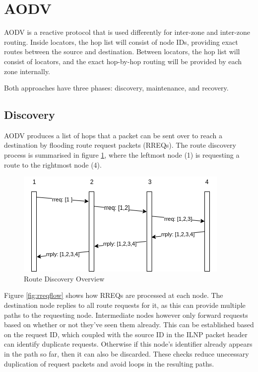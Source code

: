 \documentclass[12pt]{article}
\begin{document}
\section{AODV}

AODV is a reactive protocol that is used differently for inter-zone and inter-zone routing. Inside locators, the hop list will consist of node IDs, providing exact routes between the source and destination. Between locators, the hop list will consist of locators, and the exact hop-by-hop routing will be provided by each zone internally.

Both approaches have three phases: discovery, maintenance, and recovery.

\subsection{Discovery}

AODV produces a list of hops that a packet can be sent over to reach a destination by flooding route request packets (RREQs). The route discovery process is summarised in figure \ref{fig:path}, where the leftmost node (1) is requesting a route to the rightmost node (4).

\begin{figure}[!ht]
	\centering
	\includegraphics[width=\linewidth]{images/path}
	\caption{Route Discovery Overview}
	\label{fig:path}
\end{figure}

Figure \ref{fig:rreqflow} shows how RREQs are processed at each node. The destination node replies to all route requests for it, as this can provide multiple paths to the requesting node. Intermediate nodes however only forward requests based on whether or not they've seen them already. This can be established based on the request ID, which coupled with the source ID in the ILNP packet header can identify duplicate requests. Otherwise if this node's identifier already appears in the path so far, then it can also be discarded. These checks reduce unecessary duplication of request packets and avoid loops in the resulting paths.
\end{document}
